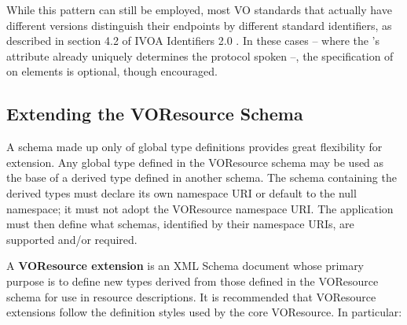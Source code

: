 \documentclass[11pt,a4paper]{ivoa}
\begin{document}
While this pattern can still be employed, most VO standards that
actually have different versions distinguish their endpoints by
different standard identifiers, as described in section 4.2 of IVOA
Identifiers 2.0 \citep{std:identifiers2}.  In these cases -- where the
's  attribute already uniquely
determines the protocol spoken --, the specification of 
on  elements is optional, though encouraged.

\subsection{Extending the VOResource Schema}

\label{sect:extending}

A schema made up only of global type definitions provides great
flexibility for extension.  Any global type defined in the VOResource
schema may be used as the base of a derived type defined in another
schema.  The schema containing the derived types must declare its own
namespace URI or default to the null namespace; it must not adopt the
VOResource namespace URI.  The application must then define what
schemas, identified by their namespace URIs, are supported and/or
required.  



A \textbf{VOResource extension} is an XML Schema document whose primary
purpose is to define new types derived from those defined in the
VOResource schema for use in resource descriptions.  It is recommended
that VOResource extensions follow the definition styles used by the core
VOResource.  In particular: 
\end{document}
